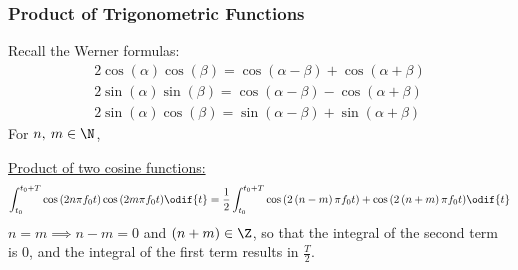 \documentclass{article}
\begin{document}
\subsubsection{Product of Trigonometric Functions}
Recall the Werner formulas:
\begin{gather*}
    2 \cos{\left( \alpha \right)} \cos{\left( \beta \right)} = \cos{\left( \alpha - \beta \right)} + \cos{\left( \alpha + \beta \right)} \\
    2 \sin{\left( \alpha \right)} \sin{\left( \beta \right)} = \cos{\left( \alpha - \beta \right)} - \cos{\left( \alpha + \beta \right)} \\
    2 \sin{\left( \alpha \right)} \cos{\left( \beta \right)} = \sin{\left( \alpha - \beta \right)} + \sin{\left( \alpha + \beta \right)}
\end{gather*}
For \(n,\: m \in \N\),

\underline{Product of two cosine functions:}
\begin{equation*}
    \int_{t_0}^{t_0 + T} \cos{\left( 2n \pi f_0 t \right)} \cos{\left( 2m \pi f_0 t \right)} \odif{t} = \frac{1}{2} \int_{t_0}^{t_0 + T} \cos{\left( 2 \left( n - m \right) \pi f_0 t \right)} + \cos{\left( 2 \left( n + m \right) \pi f_0 t \right)} \odif{t}
\end{equation*}
\(n = m \implies n - m = 0\) and \(\left( n + m \right) \in \Z\), so that the integral of the second
term is \(0\), and the integral of the first term results in \(\frac{T}{2}\).
\end{document}
